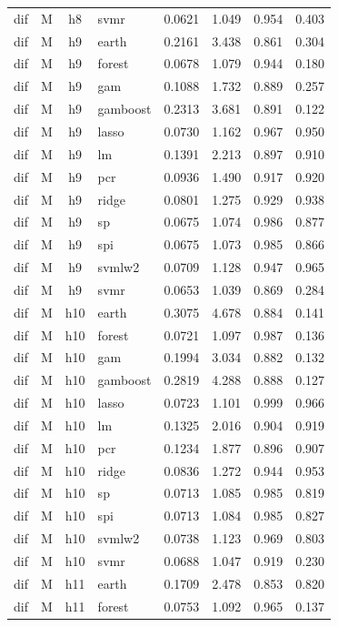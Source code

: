 \begin{ThreePartTable}
\begin{longtable}[t]{llclcccc}
dif & M & h8 & svmr & 0.0621 & 1.049 & 0.954 & 0.403\\
\addlinespace
dif & M & h9 & earth & 0.2161 & 3.438 & 0.861 & 0.304\\
dif & M & h9 & forest & 0.0678 & 1.079 & 0.944 & 0.180\\
dif & M & h9 & gam & 0.1088 & 1.732 & 0.889 & 0.257\\
dif & M & h9 & gamboost & 0.2313 & 3.681 & 0.891 & 0.122\\
dif & M & h9 & lasso & 0.0730 & 1.162 & 0.967 & 0.950\\
dif & M & h9 & lm & 0.1391 & 2.213 & 0.897 & 0.910\\
dif & M & h9 & pcr & 0.0936 & 1.490 & 0.917 & 0.920\\
dif & M & h9 & ridge & 0.0801 & 1.275 & 0.929 & 0.938\\
dif & M & h9 & sp & 0.0675 & 1.074 & 0.986 & 0.877\\
dif & M & h9 & spi & 0.0675 & 1.073 & 0.985 & 0.866\\
dif & M & h9 & svmlw2 & 0.0709 & 1.128 & 0.947 & 0.965\\
dif & M & h9 & svmr & 0.0653 & 1.039 & 0.869 & 0.284\\
\addlinespace
dif & M & h10 & earth & 0.3075 & 4.678 & 0.884 & 0.141\\
dif & M & h10 & forest & 0.0721 & 1.097 & 0.987 & 0.136\\
dif & M & h10 & gam & 0.1994 & 3.034 & 0.882 & 0.132\\
dif & M & h10 & gamboost & 0.2819 & 4.288 & 0.888 & 0.127\\
dif & M & h10 & lasso & 0.0723 & 1.101 & 0.999 & 0.966\\
dif & M & h10 & lm & 0.1325 & 2.016 & 0.904 & 0.919\\
dif & M & h10 & pcr & 0.1234 & 1.877 & 0.896 & 0.907\\
dif & M & h10 & ridge & 0.0836 & 1.272 & 0.944 & 0.953\\
dif & M & h10 & sp & 0.0713 & 1.085 & 0.985 & 0.819\\
dif & M & h10 & spi & 0.0713 & 1.084 & 0.985 & 0.827\\
dif & M & h10 & svmlw2 & 0.0738 & 1.123 & 0.969 & 0.803\\
dif & M & h10 & svmr & 0.0688 & 1.047 & 0.919 & 0.230\\
\addlinespace
dif & M & h11 & earth & 0.1709 & 2.478 & 0.853 & 0.820\\
dif & M & h11 & forest & 0.0753 & 1.092 & 0.965 & 0.137\\

\end{longtable}
\end{ThreePartTable}
